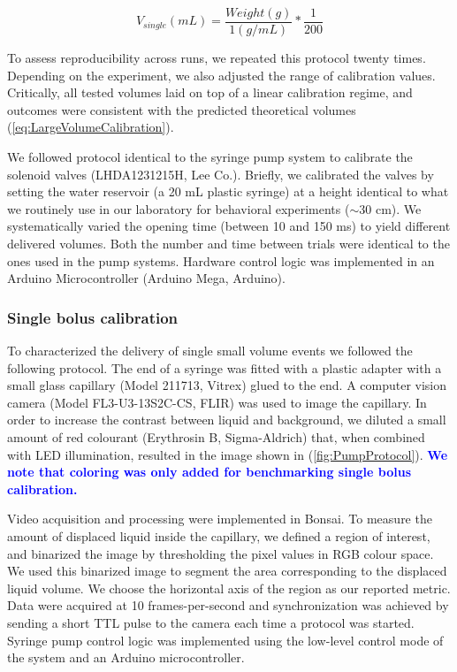 \begin{equation} \label{eq:LargeVolumeCalibration}
    V_{single}(mL) = \frac{Weight (g)}{1 (g/mL)} * \frac{1}{200}
    \end{equation}

To assess reproducibility across runs, we repeated this protocol twenty times. Depending on the experiment, we also adjusted the range of calibration values. Critically, all tested volumes laid on top of a linear calibration regime, and outcomes were consistent with the predicted theoretical volumes (\cref{eq:LargeVolumeCalibration}).

We followed protocol identical to the syringe pump system to calibrate the solenoid valves (LHDA1231215H, Lee Co.). Briefly, we calibrated the valves by setting the water reservoir (a 20 mL plastic syringe) at a height identical to what we routinely use in our laboratory for behavioral experiments ($\sim$30 cm). We systematically varied the opening time (between 10 and 150 ms) to yield different delivered volumes. Both the number and time between trials were identical to the ones used in the pump systems. Hardware control logic was implemented in an Arduino Microcontroller (Arduino Mega, Arduino).

\subsubsection*{Single bolus calibration}

To characterized the delivery of single small volume events we followed the following protocol. The end of a syringe was fitted with a plastic adapter with a small glass capillary (Model 211713, Vitrex) glued to the end. A computer vision camera (Model FL3-U3-13S2C-CS, FLIR) was used to image the capillary.
In order to increase the contrast between liquid and background, we diluted a small amount of red colourant (Erythrosin B, Sigma-Aldrich) that, when combined with LED illumination, resulted in the image shown in (\cref{fig:PumpProtocol}). \textcolor{blue}{\textbf{We note that coloring was only added for benchmarking single bolus calibration.}}

Video acquisition and processing were implemented in Bonsai. To measure the amount of displaced liquid inside the capillary, we defined a region of interest, and binarized the image by thresholding the pixel values in RGB colour space. We used this binarized image to segment the area corresponding to the displaced liquid volume. We choose the horizontal axis of the region as our reported metric. Data were acquired at 10 frames-per-second and synchronization was achieved by sending a short TTL pulse to the camera each time a protocol was started. Syringe pump control logic was implemented using the low-level control mode of the system and an Arduino microcontroller.


